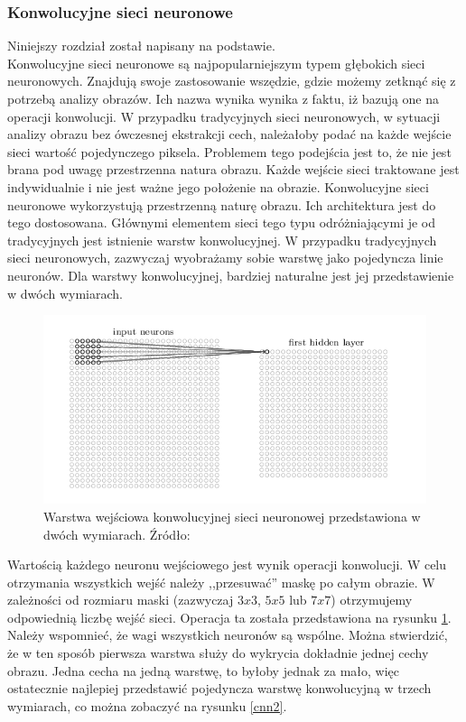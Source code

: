 \subsubsection{Konwolucyjne sieci neuronowe}
Niniejszy rozdział został napisany na podstawie\cite{nielsen}.\\
Konwolucyjne sieci neuronowe są najpopularniejszym typem głębokich sieci neuronowych. Znajdują swoje zastosowanie wszędzie, gdzie możemy zetknąć się z potrzebą analizy obrazów. Ich nazwa wynika wynika z faktu, iż bazują one na operacji konwolucji. W przypadku tradycyjnych sieci neuronowych, w sytuacji analizy obrazu bez ówczesnej ekstrakcji cech, należałoby podać na każde wejście sieci wartość pojedynczego piksela. Problemem tego podejścia jest to, że nie jest brana pod uwagę przestrzenna natura obrazu. Każde wejście sieci traktowane jest indywidualnie i nie jest ważne jego położenie na obrazie.  Konwolucyjne sieci neuronowe wykorzystują przestrzenną naturę obrazu. Ich architektura jest do tego dostosowana. Głównymi elementem sieci tego typu odróżniającymi je od tradycyjnych jest istnienie warstw konwolucyjnej. W przypadku tradycyjnych sieci neuronowych, zazwyczaj wyobrażamy sobie warstwę jako pojedyncza linie neuronów. Dla warstwy konwolucyjnej, bardziej naturalne jest jej przedstawienie w dwóch wymiarach.
\begin{figure}[ht!]
\centering
\includegraphics[scale=0.6]{res/cnn1.png}
\caption[Caption for LOF]{Warstwa wejściowa konwolucyjnej sieci neuronowej przedstawiona w dwóch wymiarach. Źródło:\cite{nielsen}\label{cnn1}} 
\end{figure}

Wartością każdego neuronu wejściowego jest wynik operacji konwolucji. W celu otrzymania wszystkich wejść należy ,,przesuwać'' maskę po całym obrazie. W zależności od rozmiaru maski (zazwyczaj $3x3$, $5x5$ lub $7x7$) otrzymujemy odpowiednią liczbę wejść sieci. Operacja ta została przedstawiona na rysunku \ref{cnn1}. Należy wspomnieć, że wagi wszystkich neuronów są wspólne. Można stwierdzić, że w ten sposób pierwsza warstwa służy do wykrycia dokładnie jednej cechy obrazu. Jedna cecha na jedną warstwę, to byłoby jednak za mało, więc ostatecznie najlepiej przedstawić pojedyncza warstwę konwolucyjną w trzech wymiarach, co można zobaczyć na rysunku \ref{cnn2}.


